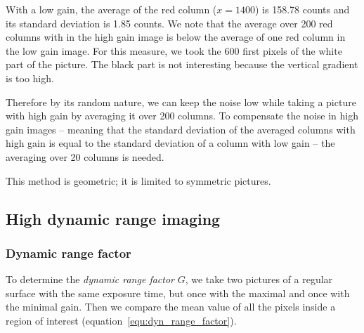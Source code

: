 \documentclass[a4paper, 12pt]{paper}
\begin{document}
With a low gain, the average of the red column ($x=1400$) is 158.78 counts and its standard deviation is 1.85 counts.
We note that the average over 200 red columns with in the high gain image is below the average of one red column in the low gain image.
For this measure, we took the 600 first pixels of the white part of the picture.
The black part is not interesting because the vertical gradient is too high.

Therefore by its random nature, we can keep the noise low while taking a picture with high gain by averaging it over 200 columns.
To compensate the noise in high gain images – meaning that the standard deviation of the averaged columns with high gain is equal to the standard deviation of a column with low gain – the averaging over 20 columns is needed.

This method is geometric; it is limited to symmetric pictures.

\subsection{High dynamic range imaging}


\subsubsection{Dynamic range factor}

To determine the \emph{dynamic range factor} $G$, we take two pictures of a regular surface with the same exposure time, but once with the maximal and once with the minimal gain.
Then we compare the mean value of all the pixels inside a region of interest (equation~\ref{equ:dyn_range_factor}).
\end{document}
